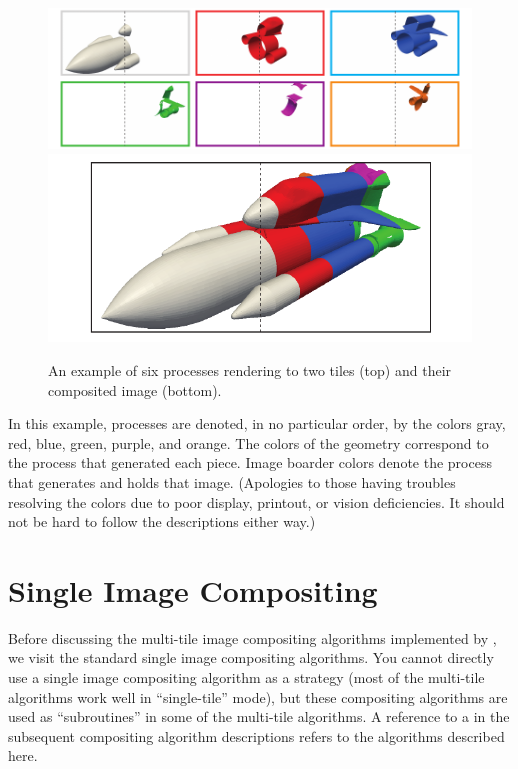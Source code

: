 \begin{figure}
  \centering
  \includegraphics{images/AllInput}
  \includegraphics{images/CompositedInput}
  \caption[Example compositing problem.]{An example of six processes
    rendering to two tiles (top) and their composited image (bottom).}
  \label{fig:ExampleInputs}
\end{figure}

In this example, processes are denoted, in no particular order, by the
colors gray, red, blue, green, purple, and orange.  The colors of the
geometry correspond to the process that generated each piece.  Image
boarder colors denote the process that generates and holds that image.
(Apologies to those having troubles resolving the colors due to poor
display, printout, or vision deficiencies.  It should not be hard to follow the
descriptions either way.)

\section{Single Image Compositing}
\label{sec:Strategies:SingleImageCompositing}


Before discussing the multi-tile image compositing algorithms implemented
by \IceT, we visit the standard single image compositing algorithms.  You
cannot directly use a single image compositing algorithm as a strategy
(most of the multi-tile algorithms work well in ``single-tile'' mode), but
these compositing algorithms are used as ``subroutines'' in some of the
multi-tile algorithms.  A reference to a
 in the subsequent compositing algorithm descriptions refers to
the algorithms described here.

